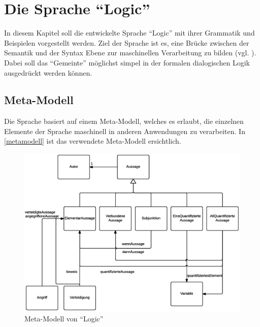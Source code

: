 \documentclass[11pt,a4paper,bibtotocnumbered]{scrreprt}
\begin{document}
\chapter{Die Sprache \enquote{Logic}} %

In diesem Kapitel soll die entwickelte Sprache \enquote{Logic} mit ihrer Grammatik und Beispielen vorgestellt werden.
Ziel der Sprache ist es, eine Brücke zwischen der Semantik und der Syntax Ebene zur maschinellen Verarbeitung zu bilden (vgl. \cite[Folie 11]{OrtnerDL}).
Dabei soll das \enquote{Gemeinte} möglichst simpel in der formalen dialogischen Logik ausgedrückt werden können.

\section{Meta-Modell}

Die Sprache basiert auf einem Meta-Modell, welches es erlaubt, die einzelnen Elemente der Sprache maschinell in anderen Anwendungen zu verarbeiten.
In \autoref{metamodell} ist das verwendete Meta-Modell ersichtlich.

\begin{figure}[htbp]
\centering
\includegraphics[width=1\textwidth]{img/metamodell.png}
\caption{Meta-Modell von \enquote{Logic}}
\label{metamodell}
\end{figure}
\end{document}
